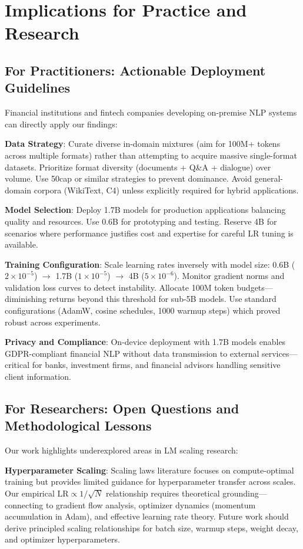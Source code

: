 \section{Implications for Practice and Research}

\subsection{For Practitioners: Actionable Deployment Guidelines}

Financial institutions and fintech companies developing on-premise NLP systems can directly apply our findings:

\textbf{Data Strategy}: Curate diverse in-domain mixtures (aim for 100M+ tokens across multiple formats) rather than attempting to acquire massive single-format datasets. Prioritize format diversity (documents + Q\&A + dialogue) over volume. Use 50cap or similar strategies to prevent dominance. Avoid general-domain corpora (WikiText, C4) unless explicitly required for hybrid applications.

\textbf{Model Selection}: Deploy 1.7B models for production applications balancing quality and resources. Use 0.6B for prototyping and testing. Reserve 4B for scenarios where performance justifies cost and expertise for careful LR tuning is available.

\textbf{Training Configuration}: Scale learning rates inversely with model size: 0.6B ($2 \times 10^{-5}$) $\rightarrow$ 1.7B ($1 \times 10^{-5}$) $\rightarrow$ 4B ($5 \times 10^{-6}$). Monitor gradient norms and validation loss curves to detect instability. Allocate 100M token budgets—diminishing returns beyond this threshold for sub-5B models. Use standard configurations (AdamW, cosine schedules, 1000 warmup steps) which proved robust across experiments.

\textbf{Privacy and Compliance}: On-device deployment with 1.7B models enables GDPR-compliant financial NLP without data transmission to external services—critical for banks, investment firms, and financial advisors handling sensitive client information.

\subsection{For Researchers: Open Questions and Methodological Lessons}

Our work highlights underexplored areas in LM scaling research:

\textbf{Hyperparameter Scaling}: Scaling laws literature \parencite{kaplan2020scaling, hoffmann2022training} focuses on compute-optimal training but provides limited guidance for hyperparameter transfer across scales. Our empirical $\text{LR} \propto 1/\sqrt{N}$ relationship requires theoretical grounding—connecting to gradient flow analysis, optimizer dynamics (momentum accumulation in Adam), and effective learning rate theory. Future work should derive principled scaling relationships for batch size, warmup steps, weight decay, and optimizer hyperparameters.

